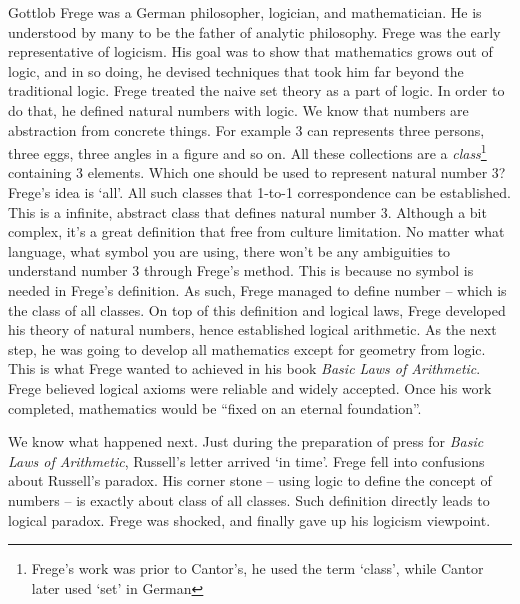 \documentclass{article}
\begin{document}
Gottlob Frege was a German philosopher, logician, and mathematician. He is understood by many to be the father of analytic philosophy. Frege was the early representative of logicism. His goal was to show that mathematics grows out of logic, and in so doing, he devised techniques that took him far beyond the traditional logic. Frege treated the naive set theory as a part of logic. In order to do that, he defined natural numbers with logic. We know that numbers are abstraction from concrete things. For example 3 can represents three persons, three eggs, three angles in a figure and so on. All these collections are a {\em class}\footnote{Frege's work was prior to Cantor's, he used the term `class', while Cantor later used `set' in German} containing 3 elements. Which one should be used to represent natural number 3? Frege's idea is `all'. All such classes that 1-to-1 correspondence can be established. This is a infinite, abstract class that defines natural number 3. Although a bit complex, it's a great definition that free from culture limitation. No matter what language, what symbol you are using, there won't be any ambiguities to understand number 3 through Frege's method. This is because no symbol is needed in Frege's definition. As such, Frege managed to define number -- which is the class of all classes. On top of this definition and logical laws, Frege developed his theory of natural numbers, hence established logical arithmetic. As the next step, he was going to develop all mathematics except for geometry from logic. This is what Frege wanted to achieved in his book {\em Basic Laws of Arithmetic}. Frege believed logical axioms were reliable and widely accepted. Once his work completed, mathematics would be ``fixed on an eternal foundation''.

We know what happened next. Just during the preparation of press for {\em Basic Laws of Arithmetic}, Russell's letter arrived `in time'. Frege fell into confusions about Russell's paradox. His corner stone -- using logic to define the concept of numbers -- is exactly about class of all classes. Such definition directly leads to logical paradox. Frege was shocked, and finally gave up his logicism viewpoint.
\end{document}
